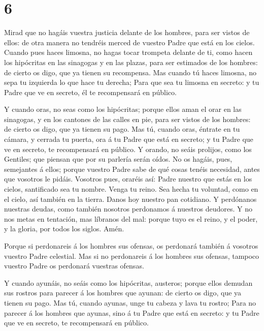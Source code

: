 \hypertarget{section-5}{%
\section{6}\label{section-5}}

 Mirad que no hagáis vuestra justicia delante de los
hombres, para ser vistos de ellos: de otra manera no tendréis merced de
vuestro Padre que está en los cielos.  Cuando pues haces
limosna, no hagas tocar trompeta delante de ti, como hacen los
hipócritas en las sinagogas y en las plazas, para ser estimados de los
hombres: de cierto os digo, que ya tienen su recompensa. 
Mas cuando tú haces limosna, no sepa tu izquierda lo que hace tu
derecha;  Para que sea tu limosna en secreto: y tu Padre que
ve en secreto, él te recompensará en público.

 Y cuando oras, no seas como los hipócritas; porque ellos
aman el orar en las sinagogas, y en los cantones de las calles en pie,
para ser vistos de los hombres: de cierto os digo, que ya tienen su
pago.  Mas tú, cuando oras, éntrate en tu cámara, y cerrada
tu puerta, ora á tu Padre que está en secreto; y tu Padre que ve en
secreto, te recompensará en público.  Y orando, no seáis
prolijos, como los Gentiles; que piensan que por su parlería serán
oídos.  No os hagáis, pues, semejantes á ellos; porque
vuestro Padre sabe de qué cosas tenéis necesidad, antes que vosotros le
pidáis.  Vosotros pues, oraréis así: Padre nuestro que estás
en los cielos, santificado sea tu nombre.  Venga tu reino.
Sea hecha tu voluntad, como en el cielo, así también en la tierra.
 Danos hoy nuestro pan cotidiano.  Y
perdónanos nuestras deudas, como también nosotros perdonamos á nuestros
deudores.  Y no nos metas en tentación, mas líbranos del
mal: porque tuyo es el reino, y el poder, y la gloria, por todos los
siglos. Amén.

 Porque si perdonareis á los hombres sus ofensas, os
perdonará también á vosotros vuestro Padre celestial.  Mas
si no perdonareis á los hombres sus ofensas, tampoco vuestro Padre os
perdonará vuestras ofensas.

 Y cuando ayunáis, no seáis como los hipócritas, austeros;
porque ellos demudan sus rostros para parecer á los hombres que ayunan:
de cierto os digo, que ya tienen su pago.  Mas tú, cuando
ayunas, unge tu cabeza y lava tu rostro;  Para no parecer á
los hombres que ayunas, sino á tu Padre que está en secreto: y tu Padre
que ve en secreto, te recompensará en público.

